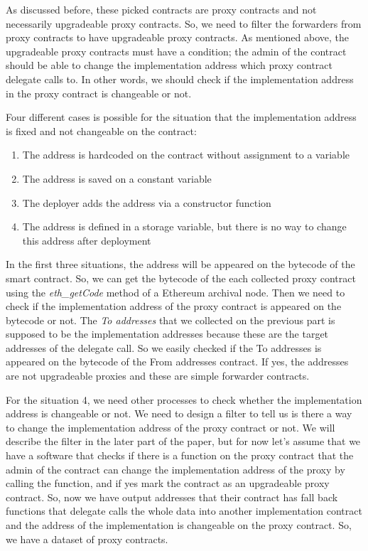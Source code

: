 As discussed before, these picked contracts are proxy contracts and not necessarily upgradeable proxy contracts. So, we need to filter the forwarders from proxy contracts to have upgradeable proxy contracts. As mentioned above, the upgradeable proxy contracts must have a condition; the admin of the contract should be able to change the implementation address which proxy contract delegate calls to. In other words, we should check if the implementation address in the proxy contract is changeable or not.

Four different cases is possible for the situation that the implementation address is fixed and not changeable on the contract:
\begin{enumerate}
  \item The address is hardcoded on the contract without assignment to a variable
  \item The address is saved on a constant variable 
  \item The deployer adds the address via a constructor function
  \item The address is defined in a storage variable, but there is no way to change this address after deployment
\end{enumerate} 

In the first three situations, the address will be appeared on the bytecode of the smart contract. So, we can get the bytecode of the each collected proxy contract using the \textit{eth\_getCode} method of a Ethereum archival node. Then we need to check if the implementation address of the proxy contract is appeared on the bytecode or not. The \textit{To addresses} that we collected on the previous part is supposed to be the implementation addresses because these are the target addresses of the delegate call. So we easily checked if the To addresses is appeared on the bytecode of the From addresses contract. If yes, the addresses are not upgradeable proxies and these are simple forwarder contracts.

For the situation 4, we need other processes to check whether the implementation address is changeable or not. We need to design a filter to tell us is there a way to change the implementation address of the proxy contract or not. We will describe the filter in the later part of the paper, but for now let's assume that we have a software that checks if there is a function on the proxy contract that the admin of the contract can change the implementation address of the proxy by calling the function, and if yes mark the contract as an upgradeable proxy contract. So, now we have output addresses that their contract has fall back functions that delegate calls the whole data into another implementation contract and the address of the implementation is changeable on the proxy contract. So, we have a dataset of proxy contracts.

